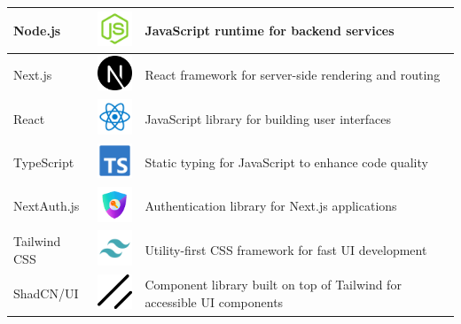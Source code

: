 \begin{longtable}{|m{3.5cm}|m{4cm}|m{6.5cm}|}
    \hline
    Node.js & \includegraphics[width=1.5cm]{pictures/web/logo/node-svgrepo-com.png} & JavaScript runtime for backend services \\
    \hline
    Next.js & \includegraphics[width=1.5cm]{pictures/web/logo/next-js.png} & React framework for server-side rendering and routing \\
    \hline
    React & \includegraphics[width=1.5cm]{pictures/web/logo/reactts-svgrepo-com.png} & JavaScript library for building user interfaces \\
    \hline
    TypeScript & \includegraphics[width=1.5cm]{pictures/web/logo/typescript-official-svgrepo-com.png} & Static typing for JavaScript to enhance code quality \\
    \hline
    NextAuth.js & \includegraphics[width=1.5cm]{pictures/web/logo/next-authe.png} & Authentication library for Next.js applications \\
    \hline
    Tailwind CSS & \includegraphics[width=1.5cm]{pictures/web/logo/tailwind-svgrepo-com.png} & Utility-first CSS framework for fast UI development \\
    \hline
    ShadCN/UI & \includegraphics[width=1.5cm]{pictures/web/logo/shad-cn-ui.png} & Component library built on top of Tailwind for accessible UI components \\

\end{longtable}
